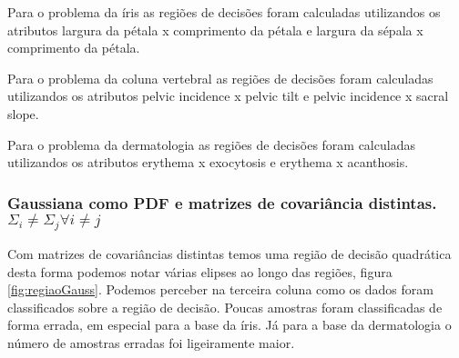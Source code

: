 \documentclass[ 
	article,			%
	11pt,				%
	oneside,			%
	a4paper,			%
	english,			%
	brazil,				%
	]{abntex2}
\begin{document}
Para o problema da íris as regiões de decisões foram calculadas utilizandos os
atributos largura da pétala x comprimento da pétala e largura da sépala x
comprimento da pétala.

Para o problema da coluna vertebral as regiões de decisões foram calculadas
utilizandos os atributos pelvic incidence x pelvic tilt e pelvic incidence x
sacral slope.

Para o problema da dermatologia as regiões de decisões foram calculadas
utilizandos os atributos erythema x exocytosis e erythema x
acanthosis.

\subsubsection{ Gaussiana como PDF e matrizes de covariância distintas.
$\Sigma_i \neq \Sigma_j \forall i \neq j $ } Com matrizes de covariâncias distintas temos uma região de
decisão quadrática desta forma podemos notar várias elipses ao longo das
regiões, figura \ref{fig:regiaoGauss}. Podemos perceber na terceira coluna como
os dados foram classificados sobre a região de decisão. Poucas amostras foram
classificadas de forma errada, em especial para a base da íris. Já para a base
da dermatologia o número de amostras erradas foi ligeiramente maior.
\end{document}
